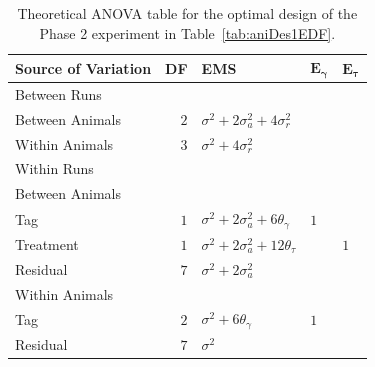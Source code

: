 \begin{table}[!ht]
\centering
 \caption{Theoretical ANOVA table for the optimal design of the Phase 2 experiment in Table~\ref{tab:aniDes1EDF}.}
 \begin{tabular}[t]{lrlll} 
 \toprule 
 \multicolumn{1}{l}{\textbf{Source of Variation}} & \multicolumn{1}{l}{\textbf{DF}} & \multicolumn{1}{l}{\textbf{EMS}}& \multicolumn{1}{l}{$\bm{E_{\gamma}}$}&\multicolumn{1}{l}{$\bm{E_{\tau}}$}\\ 
 \midrule 
 Between Runs &  &  & & \\ 
 \quad Between Animals & $2$ & $\sigma^2+2\sigma_{a}^2+4\sigma_{r}^2$ & & \\  \quad Within Animals & $3$ & $\sigma^2+4\sigma_{r}^2$ & & \\ \hline 
 Within Runs &  &  & & \\ 
 \quad Between Animals &  &  & & \\ 
 \quad \quad Tag & $1$ & $\sigma^2+2\sigma_{a}^2+6\theta_{\gamma}$ &$1$ & \\ 
 \quad \quad Treatment & $1$ & $\sigma^2+2\sigma_{a}^2+12\theta_{\tau}$ & & $1$\\ 
 \quad \quad Residual & $7$ & $\sigma^2+2\sigma_{a}^2$ & & \\ \hline 
 \quad Within Animals &  &  & & \\ 
 \quad \quad Tag & $2$ & $\sigma^2+6\theta_{\gamma}$ &$1$ & \\ 
 \quad \quad Residual & $7$ & $\sigma^2$ & & \\ 
 \bottomrule 
 \end{tabular} 
 \label{tab:ANOVAPhase1CRD11} 


\end{table}

